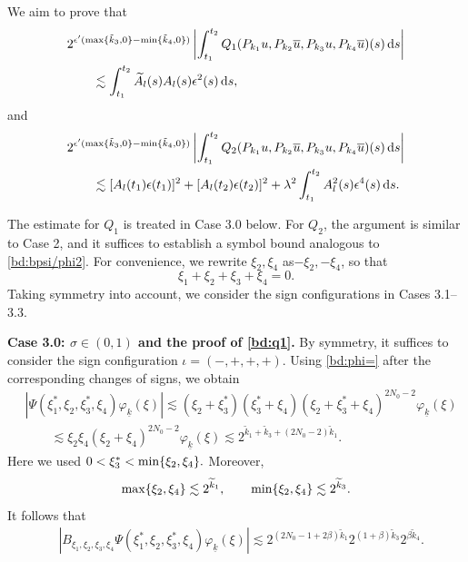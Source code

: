 \documentclass[UTF-8,reqno]{amsart}
\numberwithin{equation}{section}
\theoremstyle{definition}
\def\dif{{\mathord{{\rm d}}}}
\def\min{{\mathord{{\rm min}}}}
\def\dif{{\mathord{{\rm d}}}}
\def\min{{\mathord{{\rm min}}}}
\begin{document}
We aim to prove that
\begin{align}
&2^{\epsilon'
(\max\{\tilde k_3,0\}-\min\{\tilde k_4,0\})}
\left|
\int_{t_1}^{t_2}
Q_1(P_{k_1}u,P_{k_2}\overline u,
    P_{k_3}u,P_{k_4}\overline u)(s)
\,\dif s
\right|
\notag\\
&\qquad
\lesssim
\int_{t_1}^{t_2}
\widetilde A_l(s)A_l(s)\epsilon^2(s)
\,\dif s,
\label{bd:q1}
\end{align}
and
\begin{align}
&2^{\epsilon'
(\max\{\tilde k_3,0\}-\min\{\tilde k_4,0\})}
\left|
\int_{t_1}^{t_2}
Q_2(P_{k_1}u,P_{k_2}\overline u,
    P_{k_3}u,P_{k_4}\overline u)(s)
\,\dif s
\right|
\notag\\
&\qquad
\lesssim
[A_l(t_1)\epsilon(t_1)]^2
+
[A_l(t_2)\epsilon(t_2)]^2
+
\lambda^2
\int_{t_1}^{t_2}
A_l^2(s)\epsilon^4(s)
\,\dif s.
\label{bd:q2}
\end{align}
 

The estimate for $Q_1$ is treated in Case 3.0 below. 
For $Q_2$, the argument is similar to Case 2, and it suffices to establish a symbol bound analogous to \eqref{bd:bpsi/phi2}.
For convenience, we rewrite $\xi_2,\xi_4$ as$-\xi_2,-\xi_4$, so that
\[
\xi_1+\xi_2+\xi_3+\xi_4=0.
\]
Taking symmetry into account, we consider the sign configurations in Cases 3.1–3.3.

\textbf{Case 3.0: $\sigma\in(0,1)$ and the proof of
\eqref{bd:q1}.}
By symmetry, it suffices to consider the sign configuration
$\iota=(-,+,+,+)$. Using \eqref{bd:phi=} after the corresponding
changes of signs, we obtain
\begin{align*}
&\left|
\Psi(\xi_1^*,\xi_2,\xi_3^*,\xi_4)
\varphi_{\underline{k}}(\xi)
\right|
\lesssim
(\xi_2+\xi_3^*)
(\xi_3^*+\xi_4)
(\xi_2+\xi_3^*+\xi_4)^{2N_0-2}
\varphi_{\underline{k}}(\xi)
\\
&\qquad
\lesssim
\xi_2\xi_4
(\xi_2+\xi_4)^{2N_0-2}
\varphi_{\underline{k}}(\xi) 
\lesssim
2^{\widetilde{k}_1+\widetilde{k}_3
  +(2N_0-2)\widetilde{k}_1}.
\end{align*}
Here we used $ 0<\xi_3^*<\min\{\xi_2,\xi_4\}.$ 
Moreover,  
\[
    \max\{\xi_2,\xi_4\}\lesssim 2^{\widetilde k_1},
    \qquad
    \min\{\xi_2,\xi_4\}\lesssim 2^{\widetilde k_3}.
\]
It follows that
\begin{align*}
&\left|
B_{\xi_1,\xi_2,\xi_3,\xi_4}
\Psi(\xi_1^*,\xi_2,\xi_3^*,\xi_4)
\varphi_{\underline{k}}(\xi)
\right| 
\lesssim
2^{(2N_0-1+2\beta)\widetilde{k}_1}
2^{(1+\beta)\widetilde{k}_3}
2^{\beta\widetilde{k}_4}.
\end{align*}
\end{document}
